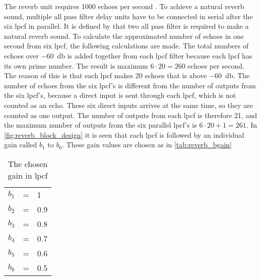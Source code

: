 %


The \gls{reverb} unit requires 1000 echoes per second \citep{natural_sounding_revorb}. To achieve a natural \gls{reverb} sound, multiple all pass filter delay units have to be connected in serial after the six \gls{lpcf} in parallel. It is defined by \citep{natural_sounding_revorb} that two all pass filter is required to make a natural \gls{reverb} sound.
To calculate the approximated number of echoes in one second from six \gls{lpcf}, the following calculations are made. The total numbers of echoes over \SI{-60}{\decibel} is added together from each \gls{lpcf} filter because each \gls{lpcf} has its own prime number. The result is maximum $6 \cdot 20 = 260$ echoes per second. The reason of this is that each \gls{lpcf} makes 20 echoes that is above \SI{-60}{\decibel}. The number of echoes from the six \gls{lpcf}'s is different from the number of outputs from the six \gls{lpcf}'s, because a direct input is sent through each \gls{lpcf}, which is not counted as an echo. These six direct inputs arrives at the same time, so they are counted as one output. The number of outputs from each \gls{lpcf} is therefore 21, and the maximum number of outputs from the six parallel \gls{lpcf}'s is $6 \cdot 20 + 1 = 261$.  In \autoref{fig:reverb_block_design} it is seen that each \gls{lpcf} is followed by an individual gain called $b_1$ to $b_6$. These gain values are chosen as in \autoref{tab:reverb_bgain}

\begin{table}[htbp]
\centering
\caption{The chosen gain in \gls{lpcf}}
\label{tab:reverb_bgain}
\begin{tabular}{lll}
$b_1$ & = & 1 \\
$b_2$ & = & 0.9 \\
$b_3$ & = & 0.8 \\
$b_4$ & = & 0.7 \\
$b_5$ & = & 0.6 \\
$b_6$ & = & 0.5 
\end{tabular}
\end{table}

